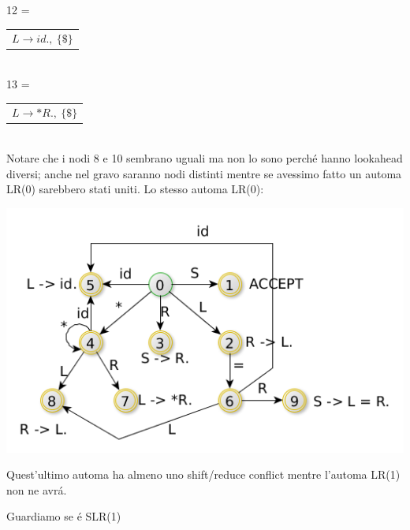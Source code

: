 12 =
\begin{tabular}{l}
	$L \rightarrow id.,\ 	\{ \$ \} $		\\
\end{tabular}\\[5pt]

13 =
\begin{tabular}{l}
	$L \rightarrow *R.,\ 	\{ \$ \} $		\\
\end{tabular}\\[5pt]

Notare che i nodi 8 e 10 sembrano uguali ma non lo sono perch\'e hanno lookahead diversi; anche nel gravo saranno nodi distinti 
mentre se avessimo fatto un automa LR(0) sarebbero stati uniti. Lo stesso automa LR(0):

\begin{center}
    \includegraphics[scale=0.6]{Chapters/Img/c05_03.png}\\
\end{center}

Quest'ultimo automa ha almeno uno shift/reduce conflict mentre l'automa LR(1) non ne avr\'a.

Guardiamo se \'e SLR(1) 

